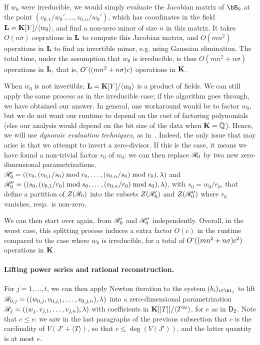 \documentclass[12pt]{article}
\begin{document}
If $w_0$ were irreducible, we would simply evaluate the Jacobian
matrix of $\bB_0$ at the point $(v_{0,1}/w_0',\dots,v_{0,n}/w_0')$,
which has coordinates in the field $\mathbf{L}=\mathbf{K}[Y]/\langle w_0 \rangle$,
and find a non-zero minor of size $n$ in this matrix. It takes
$O(n \sigma)$ oeprations in $\mathbf{L}$ to compute this Jacobian matrix, and
$O(mn^2)$ operations in $\mathbf{L}$ to find an invertible minor, e.g. using
Gaussian elimination. The total time, under the assumption that $w_0$
is irreducible, is thus $O(mn^2 + n\sigma)$ operations in $\mathbf{L}$, that is,
${O}{\,\tilde{ }\,}( (mn^2 + n\sigma) c)$ operations in $\mathbf{K}$.

When $w_0$ is not invertible, $\mathbf{L}=\mathbf{K}[Y]/\langle w_0 \rangle$ is a
product of fields. We can still apply the same process as in the
irreducible case; if the algorithm goes through, we have obtained our
answer. In general, one workaround would be to factor $w_0$, but we do
not want our runtime to depend on the cost of factoring polynomials
(else our analysis would depend on the bit size of the data when
$\mathbf{K}=\mathbb{Q}$). Hence, we will use {\em dynamic evaluation
  techniques}, as in~\cite{D5}. Indeed, the only issue that may arise
is that we attempt to invert a zero-divisor. If this is the case, it
means we have found a non-trivial factor $r_0$ of $w_0$: we can then
replace $\mathscr{R}_0$ by two new zero-dimensional parametrizations,
$\mathscr{R}'_0=((r_0,(v_{0,1}/s_0) \bmod r_0,\dots,(v_{0,n}/s_0)\bmod
r_0),\lambda)$
and
$\mathscr{R}''_0=((s_0,(v_{0,1}/r_0) \bmod s_0,\dots,(v_{0,n}/ r_0)\bmod
s_0),\lambda)$,
with $s_0=w_0/r_0$, that define a partition of $Z(\mathscr{R}_0)$ into the
subsets $Z(\mathscr{R}'_0)$ and $Z(\mathscr{R}''_0)$ where $r_0$ vanishes, resp.\
is non-zero.

We can then start over again, from $\mathscr{R}'_0$ and $\mathscr{R}''_0$
independently. Overall, in the worst case, this splitting process
induces a extra factor $O(c)$ in the runtime compared to the case
where $w_0$ is irreducible, for a total of ${O}{\,\tilde{ }\,}( (mn^2 + n\sigma) c^2)$
operations in $\mathbf{K}$.

\paragraph{Lifting power series and rational reconstruction.}
For $j=1,\dots,t$, we can then apply Newton iteration to the system
$(b_i)_{i \in \bi_j}$ to lift
$\mathscr{R}_{0,j}=((w_{0,j},v_{0,j,1},\dots,v_{0,j,n}),\lambda)$ into a
zero-dimensional parametrization
$\mathscr{R}_{j}=((w_{j},v_{j,1},\dots,v_{j,n}),\lambda)$ with coefficients
in $\mathbf{K}[[T]]/\langle T^{2e}\rangle$, for $e$ as in ${\mathsf{D}}_2$.  Note
that $c \le e$: we saw in the last paragraphs of the previous
subsection that $c$ is the cardinality of $V(J' + \langle T \rangle)$,
so that $c \le \deg(V(J'))$, and the latter quantity is at most $e$.
\end{document}
